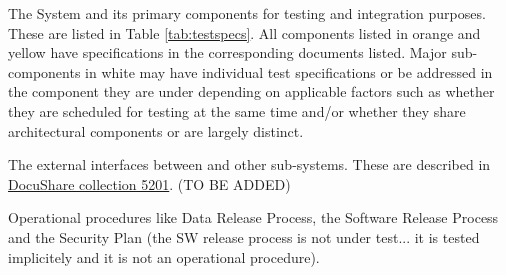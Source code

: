 \begin{itemize_single}

\item The \product{} System and its primary components for testing and integration purposes. These are listed in Table \ref{tab:testspecs}. All components listed in orange and yellow have specifications in the corresponding documents listed. Major sub-components in white may have individual test specifications or be addressed in the component they are under depending on applicable factors such as whether they are scheduled for testing at the same time and/or whether they share architectural components or are largely distinct.

\item The external interfaces between \product{} and other sub-systems. These are described in \href{https://ls.st/Collection-5201}{DocuShare collection 5201}. (TO BE ADDED)


\item Operational procedures like Data Release Process, the Software Release Process and the Security Plan (the SW release process is not under test... it is tested implicitely and it is not an operational procedure).

\end{itemize_single}

